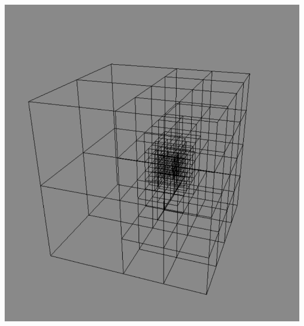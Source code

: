 \begin{frame}
\begin{columns}
\begin{column}[b]{0.42\linewidth}
{        \includegraphics[scale=0.15]{figures/adapgrid.pdf}
        \vspace{10mm}
    }
    \end{column}
    \end{columns}
\end{frame}



